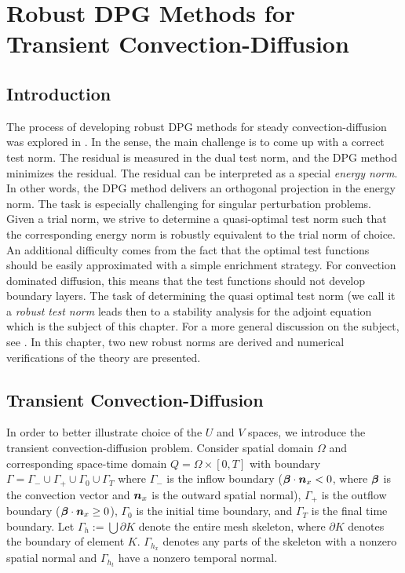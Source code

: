 \documentclass[Dissertation.tex]{subfiles}
\begin{document}
\chapter{Robust DPG Methods for Transient Convection-Diffusion}
\label{sec:robust}
\section{Introduction}
The process of developing robust DPG methods for steady convection-diffusion was explored in \cite{DemkowiczHeuer,ChanHeuerThanhDemkowicz2012}.
In the sense, the main challenge is to come up with a correct test norm. The residual is measured
in the dual test norm, and the DPG method minimizes the residual. The residual can be interpreted
as a special {\em energy norm}. In other words, the DPG method delivers an orthogonal
projection in the energy norm. The task is especially challenging for singular perturbation
problems. Given a trial norm, we strive to determine a quasi-optimal test norm such that
the corresponding energy norm is robustly equivalent to the trial  norm of choice. An additional
difficulty comes from the fact that the optimal test functions should be easily approximated
with a simple enrichment strategy. For convection dominated diffusion, this means that
the test functions should not develop boundary layers. The task of determining the
quasi optimal test norm (we call it a {\em robust test norm} leads then to a stability analysis
for the adjoint equation which is the subject of this chapter. For a more general discussion
on the subject, see \cite{DPGEncyclopedia}.
In this chapter, two new robust norms are derived and numerical verifications of the theory are presented.

\section{Transient Convection-Diffusion}
In order to better illustrate choice of the $U$ and $V$ spaces, we introduce the transient convection-diffusion problem.
Consider spatial domain $\Omega$ and corresponding space-time domain $Q=\Omega\times[0,T]$ 
with boundary $\Gamma=\Gamma_-\cup\Gamma_+\cup\Gamma_0\cup\Gamma_T$ 
where $\Gamma_-$ is the inflow boundary ($\boldsymbol\beta\cdot\boldsymbol n_x<0$, where $\boldsymbol\beta$ is the convection vector and $\boldsymbol n_x$ is the outward spatial normal),
$\Gamma_+$ is the outflow boundary ($\boldsymbol\beta\cdot\boldsymbol n_x\geq0$), $\Gamma_0$ is the initial time boundary, 
and $\Gamma_T$ is the final time boundary. Let $\Gamma_h:=\bigcup\partial K$ denote the entire mesh skeleton, 
where $\partial K$ denotes the boundary of element $K$.
$\Gamma_{h_x}$ denotes any parts of the skeleton with a nonzero spatial normal and $\Gamma_{h_t}$ have a nonzero temporal normal.
\end{document}
